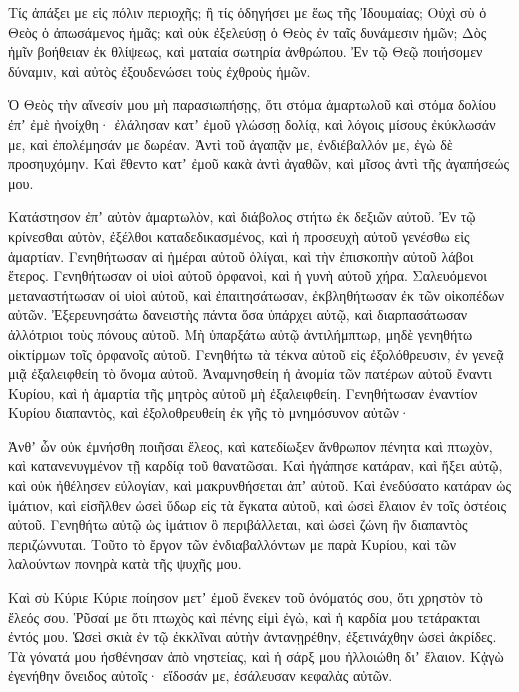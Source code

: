 \begin{spacing}{1.1}
\begin{multicols}{2}
Τίς ἀπάξει με εἰς πόλιν περιοχῆς; ἢ τίς ὁδηγήσει με ἕως τῆς Ἰδουμαίας;
Οὐχὶ σὺ ὁ Θεὸς ὁ ἀπωσάμενος ἡμᾶς; καὶ οὐκ ἐξελεύσῃ ὁ Θεὸς ἐν ταῖς δυνάμεσιν ἡμῶν;
Δὸς ἡμῖν βοήθειαν ἐκ θλίψεως, καὶ ματαία σωτηρία ἀνθρώπου.
Ἐν τῷ Θεῷ ποιήσομεν δύναμιν, καὶ αὐτὸς ἐξουδενώσει τοὺς ἐχθροὺς ἡμῶν.

Ὁ Θεὸς τὴν αἴνεσίν μου μὴ παρασιωπήσῃς,
ὅτι στόμα ἁμαρτωλοῦ καὶ στόμα δολίου ἐπʼ ἐμὲ ἠνοίχθη· ἐλάλησαν κατʼ ἐμοῦ γλώσσῃ δολίᾳ,
καὶ λόγοις μίσους ἐκύκλωσάν με, καὶ ἐπολέμησάν με δωρέαν.
Ἀντὶ τοῦ ἀγαπᾷν με, ἐνδιέβαλλόν με, ἐγὼ δὲ προσηυχόμην.
Καὶ ἔθεντο κατʼ ἐμοῦ κακὰ ἀντὶ ἀγαθῶν, καὶ μῖσος ἀντὶ τῆς ἀγαπήσεώς μου.

Κατάστησον ἐπʼ αὐτὸν ἁμαρτωλὸν, καὶ διάβολος στήτω ἐκ δεξιῶν αὐτοῦ.
Ἐν τῷ κρίνεσθαι αὐτὸν, ἐξέλθοι καταδεδικασμένος, καὶ ἡ προσευχὴ αὐτοῦ γενέσθω εἰς ἁμαρτίαν.
Γενηθήτωσαν αἱ ἡμέραι αὐτοῦ ὀλίγαι, καὶ τὴν ἐπισκοπὴν αὐτοῦ λάβοι ἕτερος.
Γενηθήτωσαν οἱ υἱοὶ αὐτοῦ ὀρφανοὶ, καὶ ἡ γυνὴ αὐτοῦ χήρα.
Σαλευόμενοι μεταναστήτωσαν οἱ υἱοὶ αὐτοῦ, καὶ ἐπαιτησάτωσαν, ἐκβληθήτωσαν ἐκ τῶν οἰκοπέδων αὐτῶν.
Ἐξερευνησάτω δανειστὴς πάντα ὅσα ὑπάρχει αὐτῷ, καὶ διαρπασάτωσαν ἀλλότριοι τοὺς πόνους αὐτοῦ.
Μὴ ὑπαρξάτω αὐτῷ ἀντιλήμπτωρ, μηδὲ γενηθήτω οἰκτίρμων τοῖς ὀρφανοῖς αὐτοῦ.
Γενηθήτω τὰ τέκνα αὐτοῦ εἰς ἐξολόθρευσιν, ἐν γενεᾷ μιᾷ ἐξαλειφθείη τὸ ὄνομα αὐτοῦ.
Ἀναμνησθείη ἡ ἀνομία τῶν πατέρων αὐτοῦ ἔναντι Κυρίου, καὶ ἡ ἁμαρτία τῆς μητρὸς αὐτοῦ μὴ ἐξαλειφθείη.
Γενηθήτωσαν ἐναντίον Κυρίου διαπαντὸς, καὶ ἐξολοθρευθείη ἐκ γῆς τὸ μνημόσυνον αὐτῶν·

Ἀνθʼ ὧν οὐκ ἐμνήσθη ποιῆσαι ἔλεος, καὶ κατεδίωξεν ἄνθρωπον πένητα καὶ πτωχὸν, καὶ κατανενυγμένον τῇ καρδίᾳ τοῦ θανατῶσαι.
Καὶ ἠγάπησε κατάραν, καὶ ἥξει αὐτῷ, καὶ οὐκ ἠθέλησεν εὐλογίαν, καὶ μακρυνθήσεται ἀπʼ αὐτοῦ.
Καὶ ἐνεδύσατο κατάραν ὡς ἱμάτιον, καὶ εἰσῆλθεν ὡσεὶ ὕδωρ εἰς τὰ ἔγκατα αὐτοῦ, καὶ ὡσεὶ ἔλαιον ἐν τοῖς ὀστέοις αὐτοῦ.
Γενηθήτω αὐτῷ ὡς ἱμάτιον ὃ περιβάλλεται, καὶ ὡσεὶ ζώνη ἣν διαπαντὸς περιζώννυται.
Τοῦτο τὸ ἔργον τῶν ἐνδιαβαλλόντων με παρὰ Κυρίου, καὶ τῶν λαλούντων πονηρὰ κατὰ τῆς ψυχῆς μου.

Καὶ σὺ Κύριε Κύριε ποίησον μετʼ ἐμοῦ ἕνεκεν τοῦ ὀνόματός σου, ὅτι χρηστὸν τὸ ἔλεός σου.
Ῥῦσαί με ὅτι πτωχὸς καὶ πένης εἰμὶ ἐγὼ, καὶ ἡ καρδία μου τετάρακται ἐντός μου.
Ὡσεὶ σκιὰ ἐν τῷ ἐκκλῖναι αὐτὴν ἀντανῃρέθην, ἐξετινάχθην ὡσεὶ ἀκρίδες.
Τὰ γόνατά μου ἠσθένησαν ἀπὸ νηστείας, καὶ ἡ σάρξ μου ἠλλοιώθη διʼ ἔλαιον.
Κᾀγὼ ἐγενήθην ὄνειδος αὐτοῖς· εἴδοσάν με, ἐσάλευσαν κεφαλὰς αὐτῶν.


\end{multicols}
\end{spacing}
